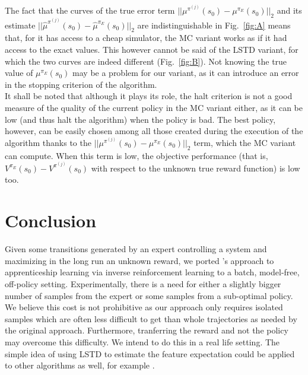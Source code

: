 \documentclass{llncs}
\begin{document}
The fact that  the curves of the true error term $||\mu^{\pi^{(j)}}(s_0) - \mu^{\pi_E}(s_0)||_2$ and  its estimate $||\hat\mu^{\pi^{(j)}}(s_0) - \hat\mu^{\pi_E}(s_0)||_2$ are indistinguishable in Fig.~\ref{fig:A} means that, for it has access to a cheap simulator, the MC variant works as if it had access to the exact values. This however cannot be said of the LSTD variant, for which the two curves are indeed different (Fig.~\ref{fig:B}). Not knowing the true value of $\mu^{\pi_E}(s_0)$ may be a problem for our variant, as it can introduce an error in the stopping criterion of the algorithm.\\

It shall be noted that although it plays its role, the halt criterion is not a good measure of the quality of the current policy in the MC variant either, as it can be low (and thus halt the algorithm) when the policy is bad. The best policy, however, can be easily chosen among all those created during the execution of the algorithm thanks to the $||\mu^{\pi^{(j)}}(s_0) - \mu^{\pi_E}(s_0)||_2$ term, which the MC variant can compute. When this term is low, the objective performance (that is, $V^{\pi_E}(s_0)-V^{\pi^{(j)}}(s_0)$ with respect to the unknown true reward function) is low too. 
\section{Conclusion}
\label{sec:conclusion}
Given some transitions generated by an expert controlling a system and maximizing in the long run an unknown reward, we ported \citet{abbeel2004apprenticeship}'s approach to apprenticeship learning via inverse reinforcement learning to a batch, model-free, off-policy setting. Experimentally, there is a need for either a slightly bigger number of samples from the expert or some samples from a sub-optimal policy. We believe this cost is not prohibitive as our approach only requires isolated samples which are often less difficult to get than whole trajectories as needed by the original approach. Furthermore, tranferring the reward and not the policy may overcome this difficulty. We intend to do this in a real life setting.
The simple idea of using LSTD to estimate the feature expectation could be applied to other algorithms as well, for example \citep{abbeel2004apprenticeship,syed2008apprenticeship,syed2008game,ziebart2008maximum}.\\

%


\end{document}
